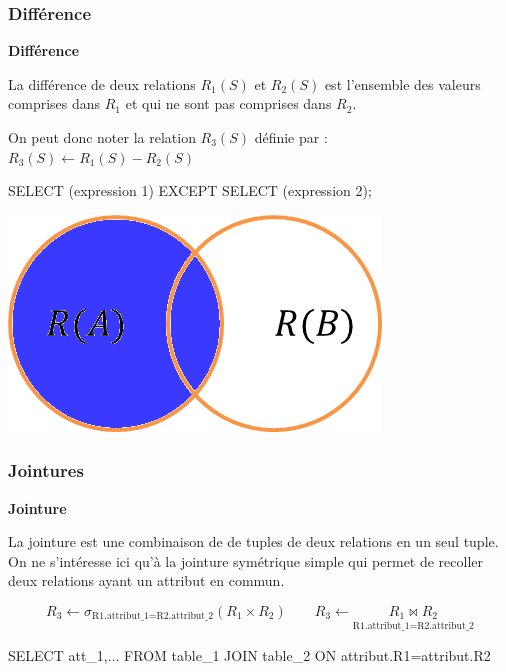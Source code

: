 \documentclass[10pt,fleqn]{article} %
\begin{document}
\subsubsection{Différence}
\begin{defi}
\begin{minipage}[c]{.75\linewidth}
\textbf{Différence}

La différence de deux relations $R_1(S)$ et $R_2(S)$ est l'ensemble des valeurs comprises dans $R_1$ et qui ne sont pas comprises dans $R_2$. 

On peut donc noter la relation $R_3(S)$ définie par : $R_3(S)\leftarrow R_1(S)-R_2(S)$

\begin{envsql}
\begin{sql}
SELECT  (expression 1) EXCEPT SELECT (expression 2);
\end{sql}
\end{envsql}

\end{minipage}\hfill
\begin{minipage}[c]{.2\linewidth}
\begin{center}
\includegraphics[width=.95\textwidth]{images/diff}
\end{center}
\end{minipage}
\end{defi}

\subsubsection{Jointures}

\begin{defi}

\textbf{Jointure}

La jointure est une combinaison de de tuples de deux relations en un seul tuple. On ne s'intéresse ici qu'à la jointure symétrique simple qui permet de recoller deux relations ayant un attribut en commun. 

$$ 
R_3 \leftarrow \sigma_{\text{R1.attribut\_1=R2.attribut\_2}} (R_1\times R_2) \quad \quad 
R_3 \leftarrow \underset{\text{R1.attribut\_1=R2.attribut\_2}}{R_1 \bowtie R_2}
$$

\begin{envsql}
\begin{sql}
SELECT att_1,... FROM table_1 JOIN table_2 ON attribut.R1=attribut.R2
\end{sql}
\end{envsql}

\end{defi}
\end{document}
